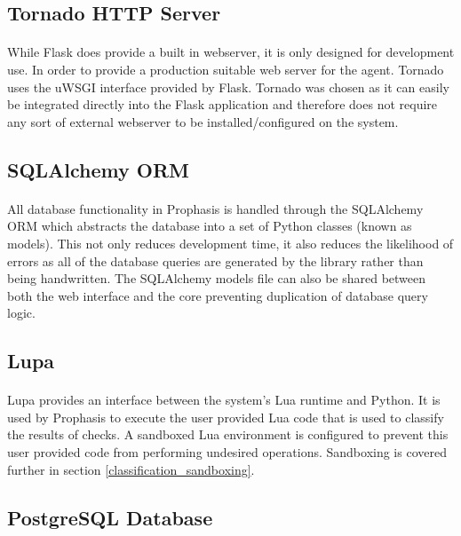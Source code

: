 \documentclass[bsc,logo,twoside,singlespacing]{infthesis}
\begin{document}
\subsection{Tornado HTTP Server}
\paragraph*{}
	While Flask does provide a built in webserver, it is only designed for
	development	use.  In order to provide a production suitable web server for the
	agent.  Tornado uses the uWSGI interface provided by Flask.  Tornado was chosen
	as it can easily be integrated directly into the Flask application and
	therefore does not require any sort of external webserver to be
	installed/configured on the system.

\subsection{SQLAlchemy ORM}
\paragraph*{}
	All database functionality in Prophasis is handled through the SQLAlchemy ORM
	which abstracts the database into a set of Python classes (known as models).
	This not only reduces development time, it also reduces the likelihood of
	errors as all of the database queries are generated by the library rather than
	being handwritten.  The SQLAlchemy models file can also be shared between both
	the web interface and the core preventing duplication of database query logic.

\subsection{Lupa}
\paragraph*{}
	Lupa provides an interface between the system's Lua runtime and Python.  It is
	used by Prophasis to execute the user provided Lua code that is used to
	classify the results of checks. A sandboxed Lua environment is configured to
	prevent this user provided code from performing undesired operations.
	Sandboxing is covered further in section \ref{classification_sandboxing}.

\subsection{PostgreSQL Database}
\end{document}
